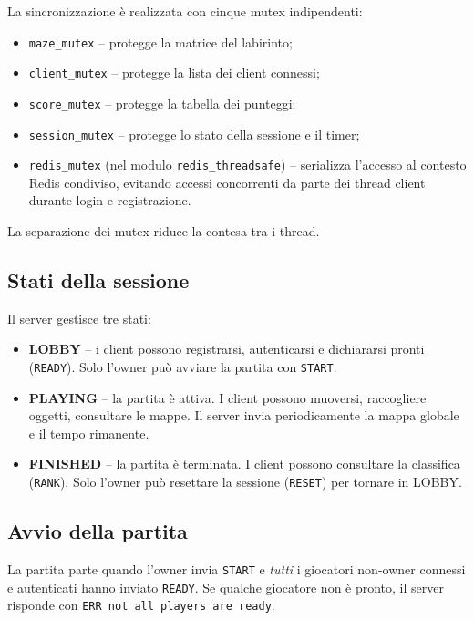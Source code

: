 \documentclass[a4paper,11pt]{article}
\begin{document}
La sincronizzazione è realizzata con cinque mutex indipendenti:
\begin{itemize}[topsep=0.3em]
    \item \texttt{maze\_mutex} -- protegge la matrice del labirinto;
    \item \texttt{client\_mutex} -- protegge la lista dei client connessi;
    \item \texttt{score\_mutex} -- protegge la tabella dei punteggi;
    \item \texttt{session\_mutex} -- protegge lo stato della sessione
          e il timer;
    \item \texttt{redis\_mutex} (nel modulo \texttt{redis\_threadsafe}) --
          serializza l'accesso al contesto Redis condiviso, evitando
          accessi concorrenti da parte dei thread client durante login
          e registrazione.
\end{itemize}

La separazione dei mutex riduce la contesa tra i thread.

\subsection{Stati della sessione}

Il server gestisce tre stati:
\begin{itemize}[topsep=0.3em]
    \item \textbf{LOBBY} -- i client possono registrarsi, autenticarsi
          e dichiararsi pronti (\texttt{READY}). Solo l'owner può avviare
          la partita con \texttt{START}.
    \item \textbf{PLAYING} -- la partita è attiva. I client possono muoversi,
          raccogliere oggetti, consultare le mappe. Il server invia
          periodicamente la mappa globale e il tempo rimanente.
    \item \textbf{FINISHED} -- la partita è terminata. I client possono
          consultare la classifica (\texttt{RANK}). Solo l'owner può
          resettare la sessione (\texttt{RESET}) per tornare in LOBBY.
\end{itemize}

\subsection{Avvio della partita}

La partita parte quando l'owner invia \texttt{START} e \emph{tutti}
i giocatori non-owner connessi e autenticati hanno inviato \texttt{READY}.
Se qualche giocatore non è pronto, il server risponde con
\texttt{ERR not all players are ready}.
\end{document}
